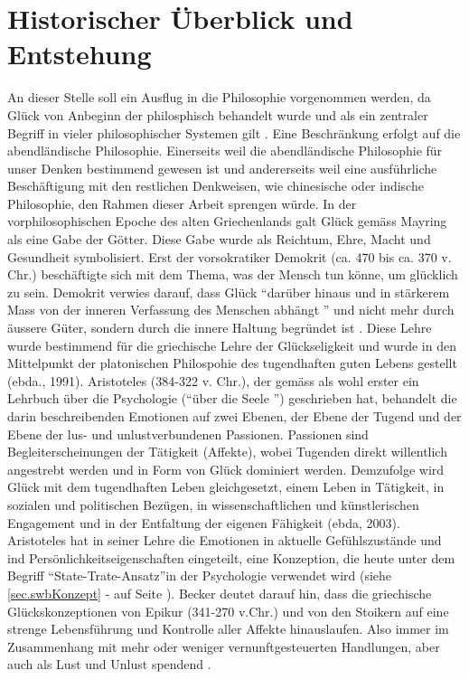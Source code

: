 \section{Historischer Überblick und Entstehung}\label{überblick}
An dieser Stelle soll ein Ausflug in die Philosophie vorgenommen werden, da Glück von Anbeginn der philosphisch behandelt wurde und als ein zentraler Begriff in vieler philosophischer Systemen gilt \cite{Mayring:1991}. Eine Beschränkung erfolgt auf die abendländische Philosophie. Einerseits weil die abendländische Philosophie für unser Denken bestimmend gewesen ist und andererseits weil eine ausführliche Beschäftigung mit den restlichen Denkweisen, wie chinesische oder indische Philosophie, den Rahmen dieser Arbeit sprengen würde. \newline
In der vorphilosophischen Epoche des alten Griechenlands galt Glück gemäss Mayring \cite{Mayring:1991} als eine Gabe der Götter. Diese Gabe wurde als Reichtum, Ehre, Macht und Gesundheit symbolisiert. Erst der vorsokratiker Demokrit (ca. 470 bis ca. 370 v. Chr.) beschäftigte sich mit dem Thema, was der Mensch tun könne, um glücklich zu sein. Demokrit verwies darauf, dass Glück \textquotedblleft darüber hinaus und in stärkerem Mass von der inneren Verfassung des Menschen abhängt \textquotedblright \cite{Becker:1994} und nicht mehr durch äussere Güter, sondern durch die innere Haltung begründet ist \cite{Mayring:1991}. Diese Lehre wurde bestimmend für die griechische Lehre der Glückseligkeit und wurde in den Mittelpunkt der platonischen Philospohie des tugendhaften guten Lebens gestellt (ebda., 1991).\newline
Aristoteles (384-322 v. Chr.), der gemäss \cite{Mayring:2003} als wohl erster ein Lehrbuch über die Psychologie (\textquotedblleft über die Seele \textquotedblright) geschrieben hat, behandelt die darin beschreibenden Emotionen auf zwei Ebenen, der Ebene der Tugend und der Ebene der lus- und unlustverbundenen Passionen. Passionen sind Begleiterscheinungen der Tätigkeit (Affekte), wobei Tugenden direkt willentlich angestrebt werden und in Form von Glück dominiert werden. Demzufolge wird Glück mit dem tugendhaften Leben gleichgesetzt, einem Leben in Tätigkeit, in sozialen und politischen Bezügen, in wissenschaftlichen und künstlerischen Engagement und in der Entfaltung der eigenen Fähigkeit (ebda, 2003). Aristoteles hat in seiner Lehre die Emotionen in aktuelle Gefühlszustände und ind Persönlichkeitseigenschaften eingeteilt, eine Konzeption, die heute unter dem Begriff \textquotedblleft State-Trate-Ansatz\textquotedblright in der Psychologie verwendet wird (siehe \ref{sec.swbKonzept} -  auf Seite \pageref{sec.swbKonzept}). Becker \cite{Becker:1994} deutet darauf hin, dass die griechische Glückskonzeptionen von Epikur (341-270 v.Chr.) und von den Stoikern auf eine strenge Lebensführung und Kontrolle aller Affekte hinauslaufen. Also immer im Zusammenhang mit mehr oder weniger vernunftgesteuerten Handlungen, aber auch als Lust und Unlust spendend \cite{Mayring:2003}.\newline

